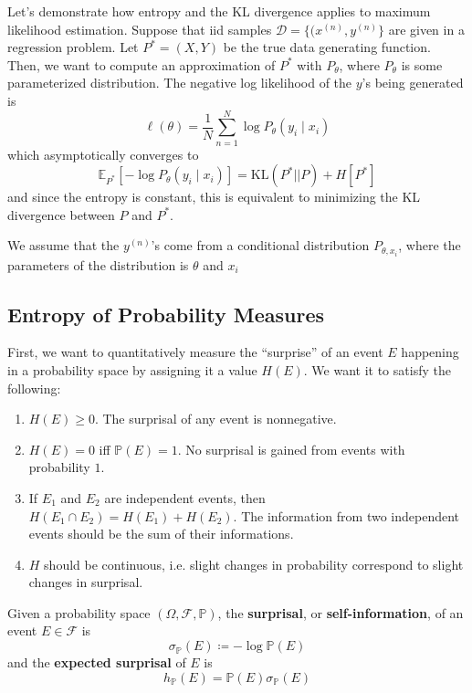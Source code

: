 \documentclass{article}
\begin{document}
    Let's demonstrate how entropy and the KL divergence applies to maximum likelihood estimation. Suppose that iid samples $\mathcal{D} = \{(x^{(n)}, y^{(n)}\}$ are given in a regression problem. Let $P^\ast = (X, Y)$ be the true data generating function. Then, we want to compute an approximation of $P^\ast$ with $P_\theta$, where $P_\theta$ is some parameterized distribution. The negative log likelihood of the $y$'s being generated is 
    \begin{equation}
      \ell(\theta) = \frac{1}{N} \sum_{n=1}^N \log P_\theta (y_i \mid x_i)
    \end{equation}
    which asymptotically converges to 
    \begin{equation}
      \mathbb{E}_{P^\ast} [ -\log P_\theta (y_i \mid x_i)] = \mathrm{KL}(P^\ast || P) + H[P^\ast]
    \end{equation}
    and since the entropy is constant, this is equivalent to minimizing the KL divergence between $P$ and $P^\ast$. 

    We assume that the $y^{(n)}$'s come from a conditional distribution $P_{\theta, x_i}$, where the parameters of the distribution is $\theta$ and $x_i$ 
  
  \subsection{Entropy of Probability Measures}

    First, we want to quantitatively measure the ``surprise'' of an event $E$ happening in a probability space by assigning it a value $H(E)$. We want it to satisfy the following: 
    \begin{enumerate}
      \item $H(E) \geq 0$. The surprisal of any event is nonnegative. 
      \item $H(E) = 0$ iff $\mathbb{P}(E) = 1$. No surprisal is gained from events with probability $1$. 
      \item If $E_1$ and $E_2$ are independent events, then $H(E_1 \cap E_2) = H(E_1) + H(E_2)$. The information from two independent events should be the sum of their informations. 
      \item $H$ should be continuous, i.e. slight changes in probability correspond to slight changes in surprisal. 
    \end{enumerate}

    \begin{definition}[Surprisal]
      Given a probability space $(\Omega, \mathcal{F}, \mathbb{P})$, the \textbf{surprisal}, or \textbf{self-information}, of an event $E \in \mathcal{F}$ is 
      \begin{equation}
        \sigma_\mathbb{P} (E) \coloneqq - \log \mathbb{P}(E)
      \end{equation}
      and the \textbf{expected surprisal} of $E$ is 
      \begin{equation}
        h_\mathbb{P} (E) = \mathbb{P}(E) \sigma_\mathbb{P} (E)
      \end{equation}
    \end{definition}
\end{document}

